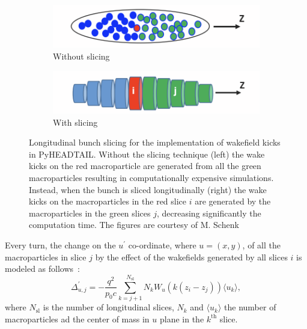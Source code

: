 {\begin{enumerate}
    \begin{figure}[!ht]
        \centering
        \begin{subfigure}[t]{0.45\textwidth}
            \centering
            \includegraphics[width=1\textwidth]{images/Ch2/before_slicing.png}
            \caption{Without slicing}
        \end{subfigure}
        \hfill
        \begin{subfigure}[t]{0.45\textwidth}
            \centering
            \includegraphics[width=1\textwidth]{images/Ch2/after_slicing.png}
            \caption{With slicing}
        \end{subfigure}
        \hfill
         \caption{Longitudinal bunch slicing for the implementation of wakefield kicks in PyHEADTAIL. Without the slicing technique (left) the wake kicks on the red macroparticle are generated from all the green macroparticles resulting in computationally expensive simulations. Instead, when the bunch is sliced longitudinally (right) the wake kicks on the macroparticles in the red slice $i$ are generated by the macroparticles in the green slices $j$, decreasing significantly the computation time. The figures are courtesy of M. Schenk~\cite{pyheadtail_schenk}} %
         \label{fig:longitudinal_slicing_wakefields}
     \end{figure}
       
    Every turn, the change on the $u^\prime$ co-ordinate, where $u=(x,y)$, of all the macroparticles in slice $j$ by the effect of the wakefields generated by all slices $i$ is modeled as follows~\cite{pyheadtail_manual_adrian}:
    \begin{equation}\label{eq:wakefield_kick_pyheadtail}
        \Delta_{u,j}^\prime = - \frac{q^2}{p_0 c}\sum_{k=j+1}^{N_\mathrm{sl}}N_k W_u(k(z_i-z_j))\langle u_k \rangle,
    \end{equation}
    where $N_\mathrm{sl}$ is the number of longitudinal slices, $N_k$ and $\langle u_k \rangle$ the number of macroparticles ad the center of mass in $u$ plane in the $k^\mathrm{th}$ slice.
    

\end{enumerate}}

